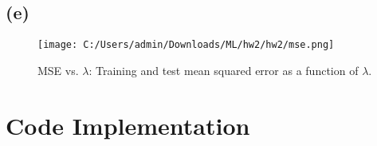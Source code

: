 \documentclass{article}
\begin{document}
\newpage
\subsection*{(e)}

\begin{figure}[h]
    \centering
    \texttt{[image: C:/Users/admin/Downloads/ML/hw2/hw2/mse.png]}
    \caption{MSE vs. $\lambda$: Training and test mean squared error as a function of $\lambda$.}
    \label{fig:mse}
\end{figure}

\clearpage  %

\section*{Code Implementation}
\end{document}
